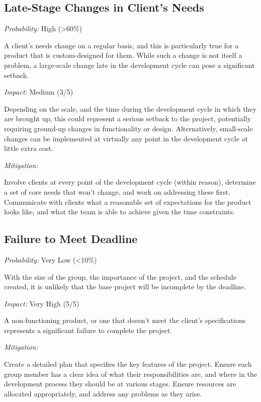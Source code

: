 \documentclass[11pt]{article}
\begin{document}
\subsection{Late-Stage Changes in Client's Needs}
\textit{Probability:} High (\textgreater60\%) \begin{addmargin}[1em]{2em} A client’s needs change on
a regular basis, and this is particularly true for a product that is custom-designed for them. While
such a change is not itself a problem, a large-scale change late in the development cycle can pose a
significant setback.\end{addmargin}\vspace{2mm}
\noindent \textit{Impact:} Medium (3/5) \begin{addmargin}[1em]{2em} Depending on the
scale, and the time during the development cycle in which they are brought up,
this could represent a serious setback to the project, potentially requiring ground-up changes in
functionality or design. Alternatively, small-scale changes can be implemented at virtually any
point in the development cycle at little extra cost.\end{addmargin}\vspace{2mm}
\noindent \textit{Mitigation:} \begin{addmargin}[1em]{2em} Involve clients at every point of the
development cycle (within reason), determine a set of core needs that won’t change, and work on
addressing these first. Communicate with clients what a reasonable set of expectations for the
product looks like, and what the team is able to achieve given the time constraints. \end{addmargin}

\subsection{Failure to Meet Deadline}
\textit{Probability:} Very Low (\textless10\%) \begin{addmargin}[1em]{2em} With the size of the
group, the importance of the project, and the schedule created, it is unlikely that the base project
will be incomplete by the deadline.\end{addmargin}\vspace{2mm}
\noindent \textit{Impact:} Very High (5/5) \begin{addmargin}[1em]{2em} A non-functioning product, or
one that doesn't meet the client's specifications represents a significant failure to complete the
project. \end{addmargin}\vspace{2mm}
\noindent \textit{Mitigation:} \begin{addmargin}[1em]{2em} Create a detailed plan that specifies the
key features of the project. Ensure each group member has a clear idea of what their
responsibilities are, and where in the development process they should be at various stages.
Ensure resources are allocated appropriately, and address any problems as they
arise.\end{addmargin}
\end{document}
